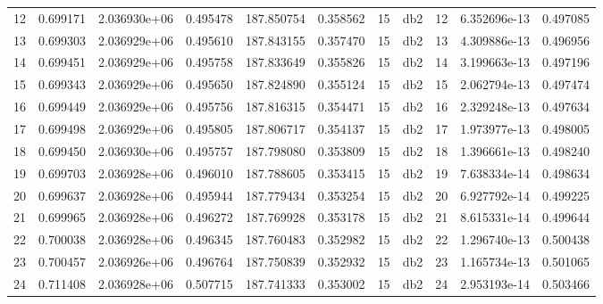 \begin{tabular}{lrrrrrrlrrr}
12   &    0.699171 &        2.036930e+06 &  0.495478 &              187.850754 &    0.358562 &      15 &          db2 &     12 &   6.352696e-13 &      0.497085 \\
13   &    0.699303 &        2.036929e+06 &  0.495610 &              187.843155 &    0.357470 &      15 &          db2 &     13 &   4.309886e-13 &      0.496956 \\
14   &    0.699451 &        2.036929e+06 &  0.495758 &              187.833649 &    0.355826 &      15 &          db2 &     14 &   3.199663e-13 &      0.497196 \\
15   &    0.699343 &        2.036929e+06 &  0.495650 &              187.824890 &    0.355124 &      15 &          db2 &     15 &   2.062794e-13 &      0.497474 \\
16   &    0.699449 &        2.036929e+06 &  0.495756 &              187.816315 &    0.354471 &      15 &          db2 &     16 &   2.329248e-13 &      0.497634 \\
17   &    0.699498 &        2.036929e+06 &  0.495805 &              187.806717 &    0.354137 &      15 &          db2 &     17 &   1.973977e-13 &      0.498005 \\
18   &    0.699450 &        2.036930e+06 &  0.495757 &              187.798080 &    0.353809 &      15 &          db2 &     18 &   1.396661e-13 &      0.498240 \\
19   &    0.699703 &        2.036928e+06 &  0.496010 &              187.788605 &    0.353415 &      15 &          db2 &     19 &   7.638334e-14 &      0.498634 \\
20   &    0.699637 &        2.036928e+06 &  0.495944 &              187.779434 &    0.353254 &      15 &          db2 &     20 &   6.927792e-14 &      0.499225 \\
21   &    0.699965 &        2.036928e+06 &  0.496272 &              187.769928 &    0.353178 &      15 &          db2 &     21 &   8.615331e-14 &      0.499644 \\
22   &    0.700038 &        2.036928e+06 &  0.496345 &              187.760483 &    0.352982 &      15 &          db2 &     22 &   1.296740e-13 &      0.500438 \\
23   &    0.700457 &        2.036926e+06 &  0.496764 &              187.750839 &    0.352932 &      15 &          db2 &     23 &   1.165734e-13 &      0.501065 \\
24   &    0.711408 &        2.036928e+06 &  0.507715 &              187.741333 &    0.353002 &      15 &          db2 &     24 &   2.953193e-14 &      0.503466 \\

\end{tabular}
